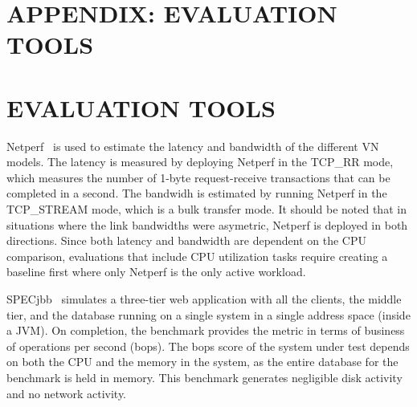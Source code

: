 %

{\chapter*{APPENDIX: EVALUATION TOOLS}
\label{evaluation_tools}
\setcounter{chapter}{1}}
{\chapter{EVALUATION TOOLS}
\label{evaluation_tools}}

Netperf~\cite{netperf} is used to estimate the latency and bandwidth of the
different VN models. The latency is measured by deploying Netperf in the
TCP\_RR mode, which measures the number of 1-byte request-receive transactions
that can be completed in a second. The bandwidh is estimated by running Netperf
in the TCP\_STREAM mode, which is a bulk transfer mode. It should be noted that
in situations where the link bandwidths were asymetric, Netperf is deployed in
both directions.  Since both latency and bandwidth are dependent on the CPU
comparison, evaluations that include CPU utilization tasks require creating
a baseline first where only Netperf is the only active workload.

SPECjbb~\cite{specjbb} simulates a three-tier web application with all the
clients, the middle tier, and the database running on a single system in a
single address space (inside a JVM). On completion, the benchmark provides the
metric in terms of business of operations per second (bops). The bops score of
the system under test depends on both the CPU and the memory in the system, as
the entire database for the benchmark is held in memory. This benchmark
generates negligible disk activity and no network activity. 
